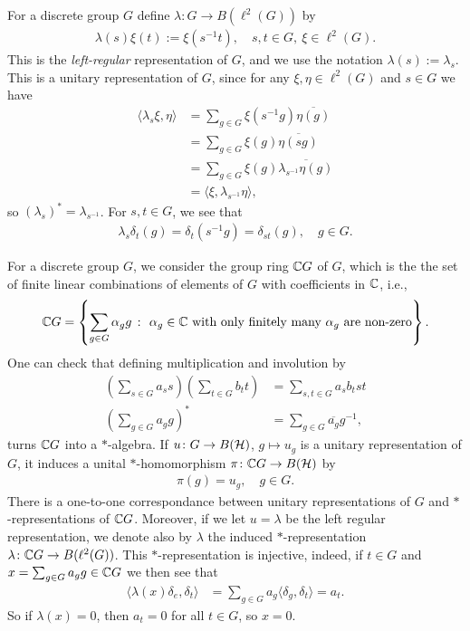 \begin{definition}
For a discrete group $G$ define $\lambda \colon G \to B(\ell^2(G))$ by
\begin{align*}
\lambda(s) \xi(t):=\xi(s^{-1}t), \quad s,t \in G, \ \xi \in \ell^2(G).
\end{align*}
This is the \emph{left-regular} representation of $G$, and we use the notation $\lambda(s):= \lambda_s$. This is a unitary representation of $G$, since for any $\xi,\eta\in \ell^2(G)$ and $s \in G$ we have 
\begin{align*}
\langle \lambda_s \xi , \eta \rangle &= \sum_{g \in G} \xi(s^{-1} g) \overline{\eta (g)}\\
&= \sum_{g \in G} \xi(g) \overline{\eta(sg)}\\
&= \sum_{g \in G} \xi(g) \overline{\lambda_{s^{-1}}\eta(g)}\\
&=\langle \xi,\lambda_{s^{-1}} \eta \rangle,
\end{align*}
so $(\lambda_s)^* = \lambda_{s^{-1}}$. For $s,t \in G$, we see that 
\begin{align*}
\lambda_{s} \delta_{t}(g) = \delta_{t} (s^{-1} g) = \delta_{st}(g), \quad g \in G.
\end{align*}
\end{definition}

For a discrete group $G$, we consider the group ring $\mathbb{C} G$ of $G$, which is the the set of finite linear combinations of elements of $G$ with coefficients in $\mathbb{C}$, i.e.,
\begin{align*}
\mathbb{C} G= \left \{ \sum_{g \in G} \alpha_g g \ \colon \ \alpha_g \in \mathbb{C} \text{ with only finitely many } \alpha_g \text{ are non-zero} \right \}.
\end{align*}
One can check that defining multiplication and involution by
\begin{align*}
\left( \sum_{s \in G} a_s s \right) \left( \sum_{t \in G} b_t t \right)&= \sum_{s,t \in G} a_s b_t st\\
\left( \sum_{g \in G} a_g g\right)^*&=\sum_{g \in G} \overline{a_g} g^{-1},
\end{align*} 
turns $\mathbb{C} G$ into a $*$-algebra. If $u \colon G \to B(\mathcal{H})$, $g \mapsto u_g$ is a unitary representation of $G$, it induces a unital $*$-homomorphism $\pi \colon \mathbb{C} G \to B(\mathcal{H})$ by
\begin{align*}
\pi(g)= u_g, \quad g \in G.
\end{align*}
There is a one-to-one correspondance between unitary representations of $G$ and $*$-representations of $\mathbb{C} G$. Moreover, if we let $u=\lambda$ be the left regular representation, we denote also by $\lambda$ the induced $*$-representation $\lambda \colon \mathbb{C} G \to B(\ell^2(G))$. This $*$-representation is injective, indeed, if $t \in G$ and $x = \sum_{g \in G} a_g g \in \mathbb{C} G$ we then see that
\begin{align*}
\langle \lambda(x) \delta_e,\delta_t\rangle &= \sum_{g \in G} a_g \langle \delta_g , \delta_t \rangle = a_t.
\end{align*}
So if $\lambda(x)=0$, then $a_t=0$ for all $t \in G$, so $x=0$.

